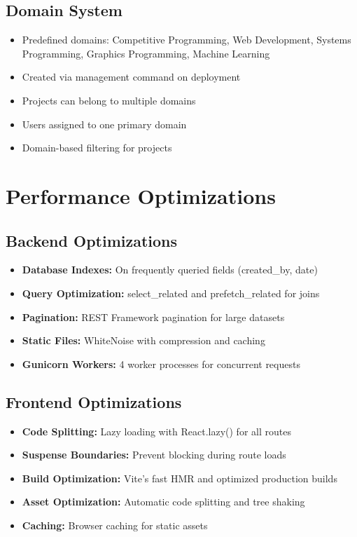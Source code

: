 \documentclass[11pt,a4paper]{article}
\begin{document}
\subsection{Domain System}
\begin{itemize}[leftmargin=*]
    \item Predefined domains: Competitive Programming, Web Development, Systems Programming, Graphics Programming, Machine Learning
    \item Created via management command on deployment
    \item Projects can belong to multiple domains
    \item Users assigned to one primary domain
    \item Domain-based filtering for projects
\end{itemize}

\section{Performance Optimizations}

\subsection{Backend Optimizations}
\begin{itemize}[leftmargin=*]
    \item \textbf{Database Indexes:} On frequently queried fields (created\_by, date)
    \item \textbf{Query Optimization:} select\_related and prefetch\_related for joins
    \item \textbf{Pagination:} REST Framework pagination for large datasets
    \item \textbf{Static Files:} WhiteNoise with compression and caching
    \item \textbf{Gunicorn Workers:} 4 worker processes for concurrent requests
\end{itemize}

\subsection{Frontend Optimizations}
\begin{itemize}[leftmargin=*]
    \item \textbf{Code Splitting:} Lazy loading with React.lazy() for all routes
    \item \textbf{Suspense Boundaries:} Prevent blocking during route loads
    \item \textbf{Build Optimization:} Vite's fast HMR and optimized production builds
    \item \textbf{Asset Optimization:} Automatic code splitting and tree shaking
    \item \textbf{Caching:} Browser caching for static assets
\end{itemize}
\end{document}
